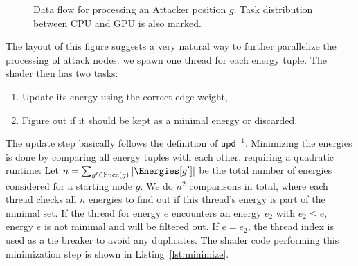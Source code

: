 \begin{figure}[ht]
\begin{center}
\end{center}
\caption{Data flow for processing an Attacker position $g$.
    Task distribution between CPU and GPU is also marked.
}%
\label{fig:attack}
\end{figure}

The layout of this figure suggests a very natural way to further parallelize
the processing of attack nodes:
we spawn one thread for each energy tuple.
The shader then has two tasks:
\begin{enumerate}
    \item Update its energy using the correct edge weight,
    \item Figure out if it should be kept as a minimal energy or discarded.
\end{enumerate}

The update step basically follows the definition of $\mathsf{upd}^{-1}$.
Minimizing the energies is done by comparing all energy tuples with each other,
requiring a quadratic runtime:
Let $n = \sum_{g' \in \mathrm{Succ}(g)} | \Energies[g'] |$ be the total number
of energies considered for a starting node $g$.
We do $n^2$ comparisons in total, where each thread checks all $n$
energies to find out if this thread's energy is part of the minimal set.
If the thread for energy $e$ encounters an energy $e_2$ with $e_2 \leq e$,
energy $e$ is not minimal and will be filtered out. If $e = e_2$, the thread
index is used as a tie breaker to avoid any duplicates.
The shader code performing this minimization step is shown in
Listing~\ref{lst:minimize}.

